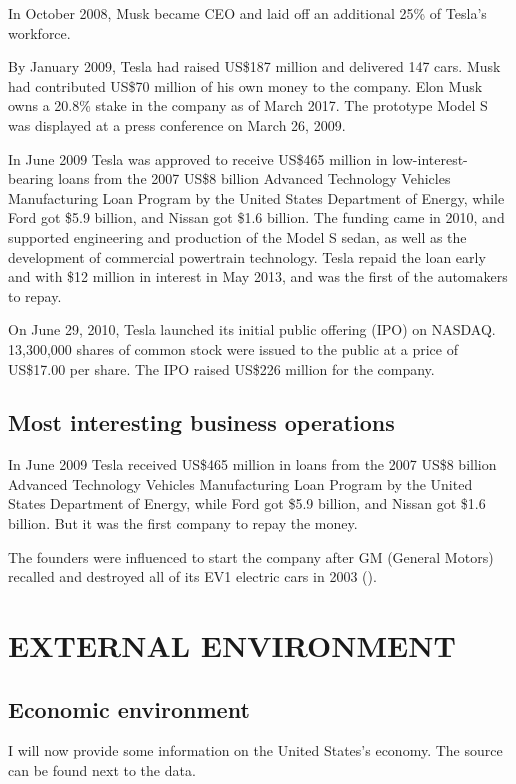 \documentclass[12pt]{article}
\begin{document}
In October 2008, Musk became CEO and laid off an additional 25\% of Tesla's workforce.

By January 2009, Tesla had raised US\$187 million and delivered 147 cars. Musk had contributed US\$70 million of his own money to the company. Elon Musk owns a 20.8\% stake in the company as of March 2017. The prototype Model S was displayed at a press conference on March 26, 2009. 

In June 2009 Tesla was approved to receive US\$465 million in low-interest-bearing loans from the 2007 US\$8 billion Advanced Technology Vehicles Manufacturing Loan Program by the United States Department of Energy, while Ford got \$5.9 billion, and Nissan got \$1.6 billion. The funding came in 2010, and supported engineering and production of the Model S sedan, as well as the development of commercial powertrain technology. Tesla repaid the loan early and with \$12 million in interest in May 2013, and was the first of the automakers to repay.

On June 29, 2010, Tesla launched its initial public offering (IPO) on NASDAQ. 13,300,000 shares of common stock were issued to the public at a price of US\$17.00 per share. The IPO raised US\$226 million for the company.

\subsection{Most interesting business operations}

In June 2009 Tesla received US\$465 million in loans from the 2007 US\$8 billion Advanced Technology Vehicles Manufacturing Loan Program by the United States Department of Energy, while Ford got \$5.9 billion, and Nissan got \$1.6 billion. But it was the first company to repay the money.

The founders were influenced to start the company after GM (General Motors) recalled and destroyed all of its EV1 electric cars in 2003 (\cite{mu17}).

\section{EXTERNAL ENVIRONMENT}

\subsection{Economic environment}

I will now provide some information on the United States's economy. The source can be found next to the data.
\end{document}

